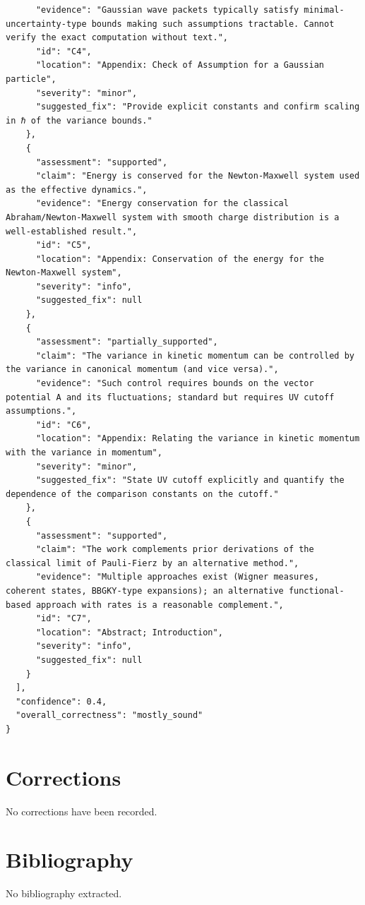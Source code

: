 \documentclass[11pt]{article}
\begin{document}
\begin{verbatim}
      "evidence": "Gaussian wave packets typically satisfy minimal-uncertainty-type bounds making such assumptions tractable. Cannot verify the exact computation without text.",
      "id": "C4",
      "location": "Appendix: Check of Assumption for a Gaussian particle",
      "severity": "minor",
      "suggested_fix": "Provide explicit constants and confirm scaling in ℏ of the variance bounds."
    },
    {
      "assessment": "supported",
      "claim": "Energy is conserved for the Newton-Maxwell system used as the effective dynamics.",
      "evidence": "Energy conservation for the classical Abraham/Newton-Maxwell system with smooth charge distribution is a well-established result.",
      "id": "C5",
      "location": "Appendix: Conservation of the energy for the Newton-Maxwell system",
      "severity": "info",
      "suggested_fix": null
    },
    {
      "assessment": "partially_supported",
      "claim": "The variance in kinetic momentum can be controlled by the variance in canonical momentum (and vice versa).",
      "evidence": "Such control requires bounds on the vector potential A and its fluctuations; standard but requires UV cutoff assumptions.",
      "id": "C6",
      "location": "Appendix: Relating the variance in kinetic momentum with the variance in momentum",
      "severity": "minor",
      "suggested_fix": "State UV cutoff explicitly and quantify the dependence of the comparison constants on the cutoff."
    },
    {
      "assessment": "supported",
      "claim": "The work complements prior derivations of the classical limit of Pauli-Fierz by an alternative method.",
      "evidence": "Multiple approaches exist (Wigner measures, coherent states, BBGKY-type expansions); an alternative functional-based approach with rates is a reasonable complement.",
      "id": "C7",
      "location": "Abstract; Introduction",
      "severity": "info",
      "suggested_fix": null
    }
  ],
  "confidence": 0.4,
  "overall_correctness": "mostly_sound"
}
\end{verbatim}

\section*{Corrections}
No corrections have been recorded.

\section*{Bibliography}
No bibliography extracted.

% 
% 
\end{document}
